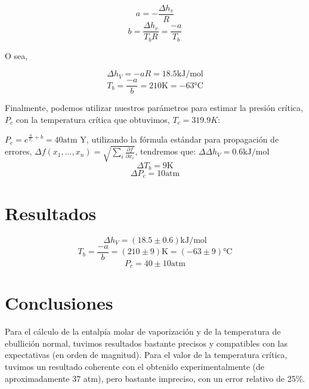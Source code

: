 \documentclass[a4paper,12pt]{article}
\begin{document}
$$a = -\frac{\Delta h_v}{R}$$
$$b = \frac{\Delta h_v}{ T_b R} = \frac{-a}{T_b}$$

O sea,

$$\Delta h_V  = - a R = 18.5 \text{kJ/mol}$$
$$T_b = \frac{-a}{b} = 210 \text{K} = -63 \text{°C}$$ 

Finalmente, podemos utilizar nuestros parámetros para estimar la presión crítica, $P_{c}$ con la temperatura crítica que obtuvimos, $T_c = 319.9 K$:

$P_c = e^{\frac{a}{T_c} + b} = 40 \text{atm}$
Y, utilizando la fórmula estándar para propagación de errores, $\Delta f(x_1, \ldots, x_n) = \sqrt{\sum_i \frac{\partial f}{\partial x_i}}$, tendremos que:
$\Delta \Delta h_V = 0.6 \text{kJ/mol}$
$$\Delta T_b = 9 \text{K}$$
$$\Delta P_c = 10 \text{atm}$$
\section{Resultados}

\begin{tcolorbox}
  \begin{equation}
    \Delta h_V  = (18.5 \pm 0.6)\text{kJ/mol}
  \end{equation}
  \begin{equation}
    T_b = \frac{-a}{b} = (210 \pm 9) \text{K} = (-63 \pm 9) \text{°C}
  \end{equation}
  \begin{equation}
    P_c = 40\pm 10 \text{atm}
  \end{equation}
\end{tcolorbox}

\section{Conclusiones}
Para el cálculo de la entalpía molar de vaporización y de la temperatura de ebullición normal, tuvimos resultados bastante precisos y compatibles con las expectativas (en orden de magnitud). Para el valor de la temperatura crítica, tuvimos un resultado coherente con el obtenido experimentalmente (de aproximadamente 37 atm), pero bastante impreciso, con un error relativo de 25\%.
\end{document}
